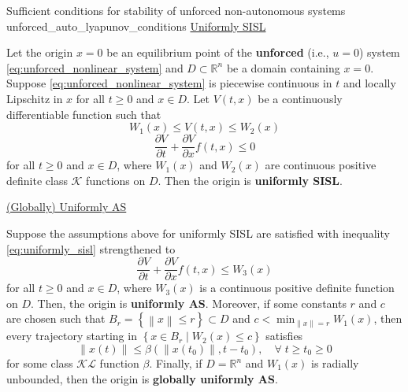 \begin{theorem}[list text=Sufficient conditions for stability of unforced non-autonomous systems,after pre=\footnotetext{This theorem combines theorem 4.1-4.3 of \cite{khalilNonlinearControl2015}. These theorems were slightly adjusted for clarity.}]{Sufficient conditions for stability of unforced non-autonomous systems \cite{khalilNonlinearControl2015}\footnotemark}{unforced_auto_lyapunov_conditions}
  \underline{Uniformly SISL}

  Let the origin $x = 0$ be an equilibrium point of the \textbf{unforced} (i.e., $u=0$) system \eqref{eq:unforced_nonlinear_system} and $D \subset\mathbb{R}^n$ be a domain containing $x = 0$. Suppose \eqref{eq:unforced_nonlinear_system} is piecewise continuous in $t$ and locally Lipschitz in $x$ for all $t \geq 0$ and $x \in D$. Let $V \left(t, x \right)$ be a continuously differentiable function such that
  \begin{equation} \label{eq:uniformly_sisl_psd}
    W_1\left(x \right)\leq V\left(t, x\right) \leq W_2\left(x \right)
  \end{equation}
  \begin{equation} \label{eq:uniformly_sisl}
    \frac{\partial V}{\partial t} + \frac{\partial V}{\partial x} f \left( t, x \right) \le 0
  \end{equation}
  for all $t \geq 0$ and $x \in D$, where $W_1\left( x \right)$ and $W_2\left( x \right)$ are continuous positive definite class $\mathcal{K}$ functions on $D$. Then the origin is \textbf{uniformly SISL}.
  \vspace{1em}

  \underline{(Globally) Uniformly AS}

  Suppose the assumptions above for uniformly SISL are satisfied with inequality \eqref{eq:uniformly_sisl} strengthened to
  \begin{equation} \label{eq:uniformly_AS}
    \frac{\partial V}{\partial t}+\frac{\partial V}{\partial x} f \left( t, x \right)\le W_3\left(x \right)
  \end{equation}
  for all $t \geq 0$ and $x \in D$, where $W_3\left( x \right)$ is a continuous positive definite function on $D$. Then, the origin is \textbf{uniformly AS}. Moreover, if some constants $r$ and $c$ are chosen such that $B_r = \left\{ \left\|x\right\| \leq r \right\} \subset D$ and $c < \min_{\left\|x\right\|=r}W_1\left(x\right)$, then every trajectory starting in $\left\{ x \in B_r\; |\; W_2\left(x\right) \le c \right\}$ satisfies
  \begin{equation}
    \left\|x\left(t \right) \right\| \leq \beta\left(\left\|x\left(t_0 \right)\right\|, t-t_0\right), \quad \forall \; t \ge t_0 \ge 0
  \end{equation}
  for some class $\mathcal{KL}$ function $\beta$. Finally, if $D = \mathbb{R}^n$ and $W_1 \left( x \right)$ is radially unbounded, then the origin is \textbf{globally uniformly AS}.
  \vspace{1em}


\end{theorem}
